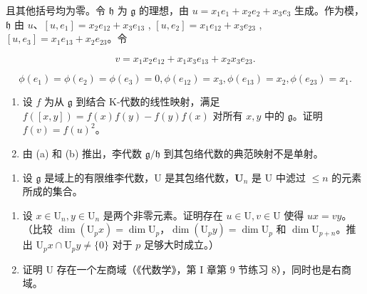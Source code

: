 且其他括号均为零。令 \(\mathfrak{h}\) 为 \(\mathfrak{g}\) 的理想，由 \(u = x_{1}e_{1} + x_{2}e_{2} + x_{3}e_{3}\) 生成。作为模，\(\mathfrak{h}\) 由 \(u\)、\([u, e_1] = x_2e_{12} + x_3e_{13}\) , \([u, e_2] = x_1e_{12} + x_3e_{23}\) , \([u, e_3] = x_1e_{13} + x_2e_{23}\)。令

\[
v = x _ {1} x _ {2} e _ {1 2} + x _ {1} x _ {3} e _ {1 3} + x _ {2} x _ {3} e _ {2 3}.
\]

\[
\phi \left(e _ {1}\right) = \phi \left(e _ {2}\right) = \phi \left(e _ {3}\right) = 0, \phi \left(e _ {1 2}\right) = x _ {3}, \phi \left(e _ {1 3}\right) = x _ {2}, \phi \left(e _ {2 3}\right) = x _ {1}.
\]

\begin{enumerate}
\def\labelenumi{(\alph{enumi})}
\setcounter{enumi}{1}
\item
  设 \(f\) 为从 \(\mathfrak{g}\) 到结合 K-代数的线性映射，满足 \(f([x,y]) = f(x)f(y) - f(y)f(x)\) 对所有 \(x, y\) 中的 \(\mathfrak{g}\)。证明 \(f(v) = f(u)^2\)。
\item
  由 (a) 和 (b) 推出，李代数 \(\mathfrak{g} / \mathfrak{h}\) 到其包络代数的典范映射不是单射。
\end{enumerate}

\begin{enumerate}
\def\labelenumi{\arabic{enumi}.}
\setcounter{enumi}{9}
\tightlist
\item
  设 \(\mathfrak{g}\) 是域上的有限维李代数，U 是其包络代数，\(\mathbf{U}_n\) 是 U 中滤过 \(\leqslant n\) 的元素所成的集合。
\end{enumerate}

\begin{enumerate}
\def\labelenumi{(\alph{enumi})}
\item
  设 \(x \in \mathrm{U}_n, y \in \mathrm{U}_n\) 是两个非零元素。证明存在 \(u \in \mathrm{U}, v \in \mathrm{U}\) 使得 \(ux = vy\)。（比较 \(\dim(\mathrm{U}_p x) = \dim \mathrm{U}_p\)，\(\dim(\mathrm{U}_p y) = \dim \mathrm{U}_p\) 和 \(\dim \mathrm{U}_{p+n}\)。推出 \(\mathrm{U}_p x \cap \mathrm{U}_p y \neq \{0\}\) 对于 \(p\) 足够大时成立。）
\item
  证明 U 存在一个左商域（《代数学》，第 I 章第 9 节练习 8），同时也是右商域。
\end{enumerate}

